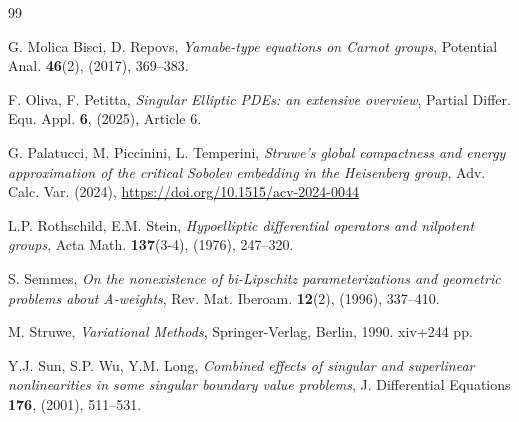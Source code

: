 \documentclass[11pt]{amsart}
\numberwithin{equation}{section} %
\theoremstyle{definition}
\begin{document}
\begin{thebibliography}{99}
	
	G. Molica Bisci, D. Repovs, 
	{\em Yamabe-type equations on Carnot groups}, 
	Potential Anal. {\bf 46}(2), (2017), 369--383.
	
	
	
	F. Oliva, F. Petitta,
	{\em Singular Elliptic PDEs: an extensive overview},
	Partial Differ. Equ. Appl. {\bf 6}, (2025), Article 6.
	
	G. Palatucci, M. Piccinini, L. Temperini,	
	{\em Struwe's global compactness and energy approximation of the critical Sobolev embedding in the Heisenberg group},
	Adv. Calc. Var. (2024), \url{https://doi.org/10.1515/acv-2024-0044}
	
	
	L.P. Rothschild, E.M. Stein, 
	{\em Hypoelliptic differential operators and nilpotent groups},
	Acta Math. {\bf 137}(3-4), (1976), 247--320.
	
	S. Semmes, 
	{\em On the nonexistence of bi-Lipschitz parameterizations and geometric problems about
		A-weights}, 
	Rev. Mat. Iberoam. {\bf 12}(2), (1996), 337--410.
	
	M. Struwe, 
	{\em Variational Methods}, 
	Springer-Verlag, Berlin, 1990. xiv+244 pp.
	
	
	Y.J. Sun, S.P. Wu, Y.M. Long, 
	{\em Combined effects of singular and superlinear nonlinearities in some
		singular boundary value problems}, 
	J. Differential Equations {\bf 176}, (2001), 511--531.
	

\end{thebibliography}
\end{document}
